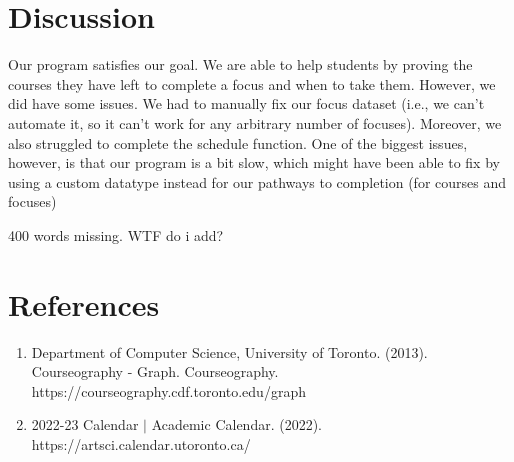 \documentclass[fontsize=11pt]{article}
\begin{document}
\section*{Discussion}
Our program satisfies our goal. We are able to help students by proving the courses they have left to complete a focus and when to take them. However, we did have some issues. We had to manually fix our focus dataset (i.e., we can't automate it, so it can't work for any arbitrary number of focuses). Moreover, we also struggled to complete the schedule function. One of the biggest issues, however, is that our program is a bit slow, which might have been able to fix by using a custom datatype instead for our pathways to completion (for courses and focuses)
\begin{huge}
400 words missing. WTF do i add?
\end{huge}


\section*{References}
\begin{enumerate}
    \item Department of Computer Science, University of Toronto. (2013). Courseography - Graph. Courseography. https://courseography.cdf.toronto.edu/graph
    \item 2022-23 Calendar $\vert$ Academic Calendar. (2022). https://artsci.calendar.utoronto.ca/
\end{enumerate}
    



\end{document}
